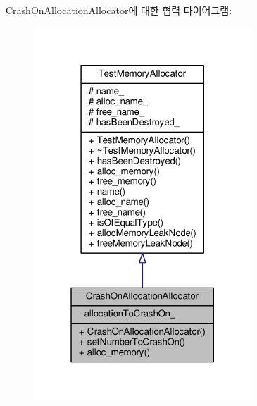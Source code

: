 Crash\+On\+Allocation\+Allocator에 대한 협력 다이어그램\+:
\nopagebreak
\begin{figure}[H]
\begin{center}
\leavevmode
\includegraphics[width=232pt]{class_crash_on_allocation_allocator__coll__graph}
\end{center}
\end{figure}
